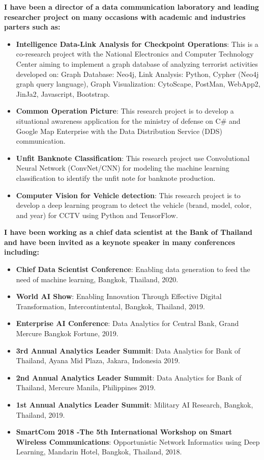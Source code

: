 \documentclass[12pt]{article}
\begin{document}
{\bfseries I have been a director of a data communication laboratory and leading researcher project on many occasions with academic and industries parters such as:}
\begin{itemize}
    \item \textbf{Intelligence Data-Link Analysis for Checkpoint Operations}: This is a  co-research project with the National Electronics and Computer Technology Center aiming to implement a graph database of analyzing terrorist activities developed on: Graph Database: Neo4j, Link Analysis: Python, Cypher (Neo4j graph query language), Graph Visualization: CytoScape, PostMan, WebApp2, JinJa2, Javascript, Bootstrap.
    \item \textbf{Common Operation Picture}: This research project is to develop a situational awareness application for the ministry of defense on C\# and Google Map Enterprise with the Data Distribution Service (DDS) communication.
    \item \textbf{Unfit Banknote Classification}: This research project use Convolutional Neural Network (ConvNet/CNN) for modeling the machine learning classification to identify the unfit note for banknote production.
    \item \textbf{Computer Vision for Vehicle detection}: This research project is to develop a deep learning program to detect the vehicle (brand, model, color, and year) for CCTV using Python and TensorFlow.
\end{itemize}

{\bfseries I have been working as a chief data scientist at the Bank of Thailand and have been invited as a keynote speaker in many conferences including:}

\begin{itemize}
  \item \textbf{Chief Data Scientist Conference}: Enabling data generation to feed the need of machine learning, Bangkok, Thailand, 2020.
  \item \textbf{World AI Show}: Enabling Innovation Through Effective Digital Transformation, Intercontintental, Bangkok, Thailand, 2019.
  \item \textbf{Enterprise AI Conference}: Data Analytics for Central Bank, Grand Mercure Bangkok Fortune, 2019.
  \item \textbf{3rd Annual Analytics Leader Summit}: Data Analytics for Bank of Thailand, Ayana Mid Plaza, Jakara, Indonesia 2019.
  \item \textbf{2nd Annual Analytics Leader Summit}: Data Analytics for Bank of Thailand, Mercure Manila, Philippines 2019.
  \item \textbf{1st Annual Analytics Leader Summit}: Military AI Research, Bangkok, Thailand, 2019.
  \item \textbf{SmartCom 2018 -The 5th International Workshop on Smart Wireless Communications}: Opportunistic Network Informatics using Deep Learning, Mandarin Hotel, Bangkok, Thailand, 2018.
\end{itemize}
\end{document}
